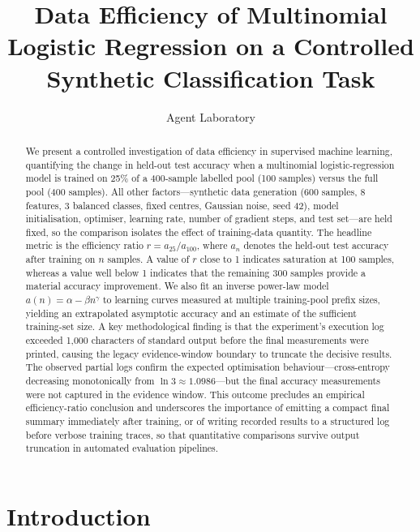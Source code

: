 \documentclass{article}
\title{Data Efficiency of Multinomial Logistic Regression on a Controlled Synthetic Classification Task}
\author{Agent Laboratory}
\date{}
\begin{document}
\maketitle

\begin{abstract}
We present a controlled investigation of data efficiency in supervised machine learning, quantifying the change in held-out test accuracy when a multinomial logistic-regression model is trained on 25\% of a 400-sample labelled pool (100 samples) versus the full pool (400 samples). All other factors---synthetic data generation (600 samples, 8 features, 3 balanced classes, fixed centres, Gaussian noise, seed 42), model initialisation, optimiser, learning rate, number of gradient steps, and test set---are held fixed, so the comparison isolates the effect of training-data quantity. The headline metric is the efficiency ratio \(r = a_{25}/a_{100}\), where \(a_n\) denotes the held-out test accuracy after training on \(n\) samples. A value of \(r\) close to 1 indicates saturation at 100 samples, whereas a value well below 1 indicates that the remaining 300 samples provide a material accuracy improvement. We also fit an inverse power-law model \(a(n)=\alpha-\beta n^\gamma\) to learning curves measured at multiple training-pool prefix sizes, yielding an extrapolated asymptotic accuracy and an estimate of the sufficient training-set size. A key methodological finding is that the experiment's execution log exceeded 1{,}000 characters of standard output before the final measurements were printed, causing the legacy evidence-window boundary to truncate the decisive results. The observed partial logs confirm the expected optimisation behaviour---cross-entropy decreasing monotonically from \(\ln 3 \approx 1.0986\)---but the final accuracy measurements were not captured in the evidence window. This outcome precludes an empirical efficiency-ratio conclusion and underscores the importance of emitting a compact final summary immediately after training, or of writing recorded results to a structured log before verbose training traces, so that quantitative comparisons survive output truncation in automated evaluation pipelines.
\end{abstract}

\section{Introduction}
\label{sec:intro}
\end{document}
